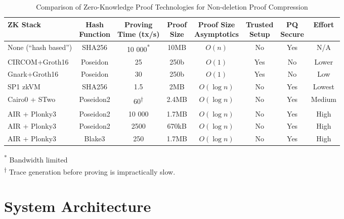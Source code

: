 \documentclass[twocolumn]{article}
\begin{document}
\begin{table}[h!]
\centering
\caption{Comparison of Zero-Knowledge Proof Technologies for Non-deletion Proof Compression}
\label{tab:zk-comparison}
\begin{tabular}{@{}lccccccc@{}}
\toprule
\textbf{ZK Stack} &
\makecell{\textbf{Hash}\\\textbf{Function}} &
\makecell{\textbf{Proving}\\\textbf{Time (tx/s)}} &
\makecell{\textbf{Proof}\\\textbf{Size}} &
\makecell{\textbf{Proof Size}\\\textbf{Asymptotics}} &
\makecell{\textbf{Trusted}\\\textbf{Setup}} &
\makecell{\textbf{PQ}\\\textbf{Secure}} &
\textbf{Effort} \\
\midrule
None (``hash based'') & SHA256 & 10 000\textsuperscript{*} & 10MB & $O(n)$ & No & Yes & N/A \\
CIRCOM+Groth16         & Poseidon & 25 & 250b & $O(1)$ & Yes & No & Lower \\
Gnark+Groth16          & Poseidon & 30 & 250b & $O(1)$ & Yes & No & Low \\
SP1 zkVM  & SHA256 & 1.5 & 2MB & $O(\log n)$ & No & Yes & Lowest \\
Cairo0 + STwo    & Poseidon2 & 60\textsuperscript{†} & 2.4MB & $O(\log n)$ & No & Yes & Medium \\
AIR + Plonky3   & Poseidon2 & 10 000 & 1.7MB & $O(\log n)$ & No & Yes & High \\
AIR + Plonky3   & Poseidon2 & 2500 & 670kB & $O(\log n)$ & No & Yes & High \\
AIR + Plonky3   & Blake3 & 250 & 1.7MB & $O(\log n)$ & No & Yes & High \\

\bottomrule
\end{tabular}

\vspace{0.5em}
\raggedright
\textsuperscript{*} Bandwidth limited\\
\textsuperscript{†} Trace generation before proving is impractically slow.
\end{table}






\section{System Architecture}
\end{document}
